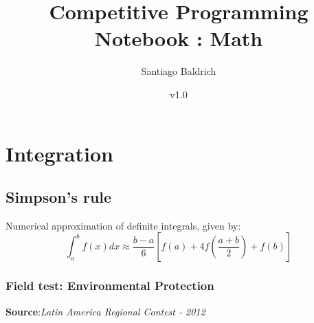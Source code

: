 \documentclass[11pt, oneside]{article}   	%
\title{Competitive Programming Notebook : Math}
\author{Santiago Baldrich}
\date{v1.0}
\begin{document}
\tableofcontents
\newpage


\section{Integration}
\subsection{Simpson's rule}
Numerical approximation of definite integrals, given by:
\[\int_{a}^{b} f(x) dx \approx \frac{b-a}{6} \left[f(a) + 4f\left(\frac{a+b}{2}\right)+f(b)\right]\]
\subsubsection{Field test: Environmental Protection}
\textbf{Source}:\textit{Latin America Regional Contest - 2012}\\
\end{document}
